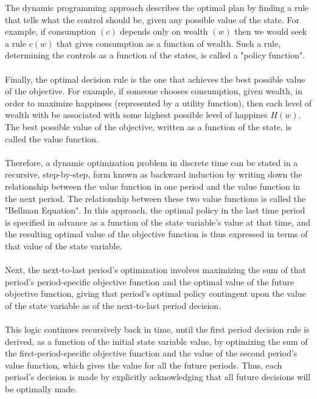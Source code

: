 \documentclass{article}
\begin{document}
The dynamic programming approach describes the optimal plan by finding a rule that tells what the control should be, given any possible value of the state. For example, if consumption $(c)$ depends only on wealth $(w)$ then we would seek a rule $c(w)$ that gives consumption as a function of wealth. Such a rule, determining the controls as a function of the states, is called a "policy function". \\ \\
Finally, the optimal decision rule is the one that achieves the best possible value of the objective. For example, if someone chooses consumption, given wealth, in order to maximize happiness (represented by a utility function), then each level of wealth with be associated with some highest possible level of happines $H(w)$. The best possible value of the objective, written as a function of the state, is called the value function. \\ \\
\vspace{1mm}
Therefore, a dynamic optimization problem in discrete time can be stated in a recursive, step-by-step, form known as backward induction by writing down the relationship between the value function in one period and the value function in the next period. The relationship between these two value functions is called the "Bellman Equation". In this approach, the optimal policy in the last time period is specified in advance as a function of the state variable's value at that time, and the resulting optimal value of the objective function is thus expressed in terms of that value of the state variable. \\ \\
Next, the next-to-last period's optimization involves maximizing the sum of that period's period-specific objective function and the optimal value of the future objective function, giving that period's optimal policy contingent upon the value of the state variable as of the next-to-last period decision. \\ \\
This logic continues recursively back in time, until the first period decision rule is derived, as a function of the initial state variable value, by optimizing the sum of the first-period-specific objective function and the value of the second period's value function, which gives the value for all the future periods. Thus, each period's decision is made by explicitly acknowledging that all future decisions will be optimally made.
\vspace{2.5mm}
\end{document}

